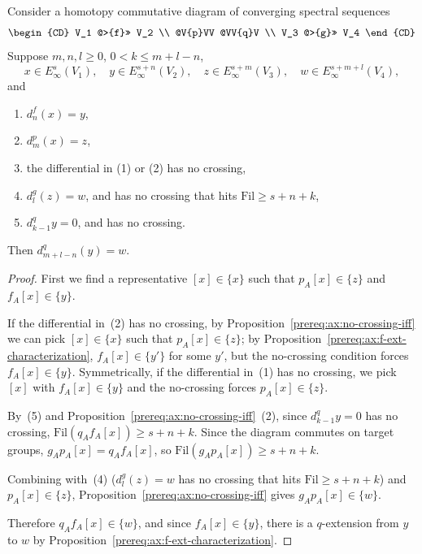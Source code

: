 \begin{axiom}\label{prereq:ax:four-spectra}
    \notready
    Consider a homotopy commutative diagram of converging spectral sequences
    $$\begin{CD}
    V_1 @>{f}>> V_2 \\
    @V{p}VV @VV{q}V \\
    V_3 @>{g}>> V_4
    \end{CD}$$
    Suppose $m, n, l \ge 0$, $0 < k \le m + l - n$,
    $$x \in E_\infty^{s}(V_1), \quad y \in E_\infty^{s+n}(V_2), \quad z \in E_\infty^{s+m}(V_3), \quad w \in E_\infty^{s+m+l}(V_4),$$
    and
    \begin{enumerate}
        \item $d_n^f(x) = y$,
        \item $d_m^p(x) = z$,
        \item the differential in (1) or (2) has no crossing,
        \item $d_l^g(z) = w$, and has no crossing that hits $\mathrm{Fil} \ge s + n + k$,
        \item $d_{k-1}^q y = 0$, and has no crossing.
    \end{enumerate}
    Then $d_{m+l-n}^q(y) = w$.
\end{axiom}
\begin{proof}\leanok
    First we find a representative $[x] \in \{x\}$ such that $p_A[x] \in \{z\}$ and $f_A[x] \in \{y\}$.

    If the differential in~(2) has no crossing, by Proposition~\ref{prereq:ax:no-crossing-iff} we can pick $[x] \in \{x\}$ such that $p_A[x] \in \{z\}$; by Proposition~\ref{prereq:ax:f-ext-characterization}, $f_A[x] \in \{y'\}$ for some $y'$, but the no-crossing condition forces $f_A[x] \in \{y\}$. Symmetrically, if the differential in~(1) has no crossing, we pick $[x]$ with $f_A[x] \in \{y\}$ and the no-crossing forces $p_A[x] \in \{z\}$.

    By~(5) and Proposition~\ref{prereq:ax:no-crossing-iff}~(2), since $d_{k-1}^q y = 0$ has no crossing, $\mathrm{Fil}(q_A f_A[x]) \ge s + n + k$. Since the diagram commutes on target groups, $g_A p_A[x] = q_A f_A[x]$, so $\mathrm{Fil}(g_A p_A[x]) \ge s + n + k$.

    Combining with~(4) ($d_l^g(z) = w$ has no crossing that hits $\mathrm{Fil} \ge s + n + k$) and $p_A[x] \in \{z\}$, Proposition~\ref{prereq:ax:no-crossing-iff} gives $g_A p_A[x] \in \{w\}$.

    Therefore $q_A f_A[x] \in \{w\}$, and since $f_A[x] \in \{y\}$, there is a $q$-extension from $y$ to $w$ by Proposition~\ref{prereq:ax:f-ext-characterization}.
\end{proof}

